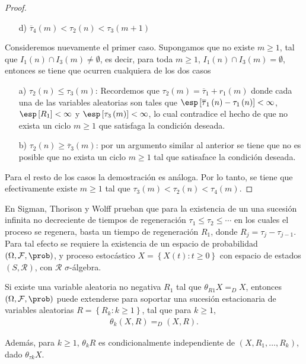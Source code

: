 \begin{proof}
\begin{itemize}
\item[d)] $\overline{\tau}_{4}\left(m\right)<\tau_{2}\left(n\right)
<\tau_{3}\left(m+1\right)$
\end{itemize}

Consideremos nuevamente el primer caso. Supongamos que no existe $m\geq1$, tal que $I_{1}\left(n\right)\cap I_{3}\left(m\right)\neq\emptyset$, es decir, para toda $m\geq1$, $I_{1}\left(n\right)\cap I_{3}\left(m\right)=\emptyset$, entonces se tiene que ocurren cualquiera de los dos casos

\begin{itemize}
\item[a)] $\tau_{2}\left(n\right)\leq\tau_{3}\left(m\right)$: Recordemos que $\tau_{2}\left(m\right)=\overline{\tau}_{1}+r_{1}\left(m\right)$ donde cada una de las variables aleatorias son tales que $\esp\left[\overline{\tau}_{1}\left(n\right)-\tau_{1}\left(n\right)\right]<\infty$, $\esp\left[R_{1}\right]<\infty$ y $\esp\left[\tau_{3}\left(m\right)\right]<\infty$, lo cual contradice el hecho de que no exista un ciclo $m\geq1$ que satisfaga la condici\'on deseada.

\item[b)] $\tau_{2}\left(n\right)\geq\overline{\tau}_{3}\left(m\right)$: por un argumento similar al anterior se tiene que no es posible que no exista un ciclo $m\geq1$ tal que satisaface la condici\'on deseada.

\end{itemize}

Para el resto de los casos la demostraci\'on es an\'aloga. Por lo tanto, se tiene que efectivamente existe $m\geq1$ tal que $\tau_{3}\left(m\right)<\tau_{2}\left(n\right)<\tau_{4}\left(m\right)$.
\end{proof}
\newpage

En Sigman, Thorison y Wolff \cite{Sigman2} prueban que para la existencia de un una sucesi\'on infinita no decreciente de tiempos de regeneraci\'on $\tau_{1}\leq\tau_{2}\leq\cdots$ en los cuales el proceso se regenera, basta un tiempo de regeneraci\'on $R_{1}$, donde $R_{j}=\tau_{j}-\tau_{j-1}$. Para tal efecto se requiere la existencia de un espacio de probabilidad $\left(\Omega,\mathcal{F},\prob\right)$, y proceso estoc\'astico $\textit{X}=\left\{X\left(t\right):t\geq0\right\}$ con espacio de estados $\left(S,\mathcal{R}\right)$, con $\mathcal{R}$ $\sigma$-\'algebra.

\begin{Prop}
Si existe una variable aleatoria no negativa $R_{1}$ tal que $\theta_{R1}X=_{D}X$, entonces $\left(\Omega,\mathcal{F},\prob\right)$ puede extenderse para soportar una sucesi\'on estacionaria de variables aleatorias $R=\left\{R_{k}:k\geq1\right\}$, tal que para $k\geq1$,
\begin{eqnarray*}
\theta_{k}\left(X,R\right)=_{D}\left(X,R\right).
\end{eqnarray*}

Adem\'as, para $k\geq1$, $\theta_{k}R$ es condicionalmente independiente de $\left(X,R_{1},\ldots,R_{k}\right)$, dado $\theta_{\tau k}X$.

\end{Prop}


